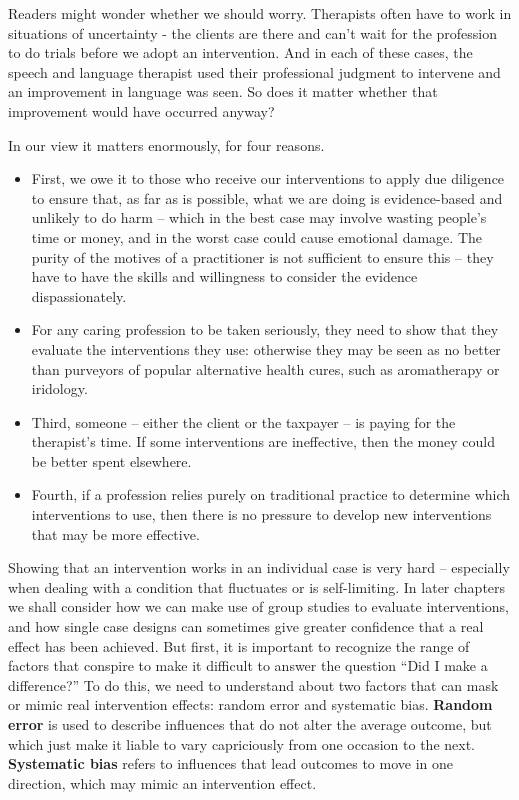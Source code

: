 \documentclass{krantz}
\providecommand{\tightlist}{%
\setlength{\itemsep}{0pt}\setlength{\parskip}{0pt}}
\begin{document}
Readers might wonder whether we should worry. Therapists often have to work in situations of uncertainty - the clients are there and can't wait for the profession to do trials before we adopt an intervention. And in each of these cases, the speech and language therapist used their professional judgment to intervene and an improvement in language was seen. So does it matter whether that improvement would have occurred anyway?

In our view it matters enormously, for four reasons.

\begin{itemize}
\tightlist
\item
  First, we owe it to those who receive our interventions to apply due diligence to ensure that, as far as is possible, what we are doing is evidence-based and unlikely to do harm -- which in the best case may involve wasting people's time or money, and in the worst case could cause emotional damage. The purity of the motives of a practitioner is not sufficient to ensure this -- they have to have the skills and willingness to consider the evidence dispassionately.
\item
  For any caring profession to be taken seriously, they need to show that they evaluate the interventions they use: otherwise they may be seen as no better than purveyors of popular alternative health cures, such as aromatherapy or iridology.
\item
  Third, someone -- either the client or the taxpayer -- is paying for the therapist's time. If some interventions are ineffective, then the money could be better spent elsewhere.
\item
  Fourth, if a profession relies purely on traditional practice to determine which interventions to use, then there is no pressure to develop new interventions that may be more effective.
\end{itemize}

Showing that an intervention works in an individual case is very hard -- especially when dealing with a condition that fluctuates or is self-limiting. In later chapters we shall consider how we can make use of group studies to evaluate interventions, and how single case designs can sometimes give greater confidence that a real effect has been achieved. But first, it is important to recognize the range of factors that conspire to make it difficult to answer the question ``Did I make a difference?'' To do this, we need to understand about two factors that can mask or mimic real intervention effects: random error and systematic bias. \textbf{Random error} is used to describe influences that do not alter the average outcome, but which just make it liable to vary capriciously from one occasion to the next. \textbf{Systematic bias}  refers to influences that lead outcomes to move in one direction, which may mimic an intervention effect.
\end{document}
